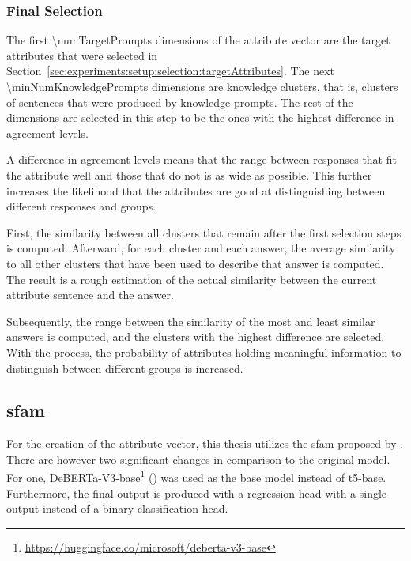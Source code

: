 \subsubsection{Final Selection} %
\label{sec:experiments:setup:selection:finalSelection}
The first \num{\numTargetPrompts} dimensions of the attribute vector are the target attributes that were selected in Section~\ref{sec:experiments:setup:selection:targetAttributes}. The next \num{\minNumKnowledgePrompts} dimensions are knowledge clusters, that is, clusters of sentences that were produced by knowledge prompts. The rest of the dimensions are selected in this step to be the ones with the highest difference in agreement levels.

A difference in agreement levels means that the range between responses that fit the attribute well and those that do not is as wide as possible. This further increases the likelihood that the attributes are good at distinguishing between different responses and groups.

% 

First, the similarity between all clusters that remain after the first selection steps is computed. Afterward, for each cluster and each answer, the average similarity to all other clusters that have been used to describe that answer is computed. The result is a rough estimation of the actual similarity between the current attribute sentence and the answer.

Subsequently, the range between the similarity of the most and least similar answers is computed, and the clusters with the highest difference are selected. With the process, the probability of attributes holding meaningful information to distinguish between different groups is increased.

\subsection{\acf{sfam}}
\label{sec:experiments:setup:sfam}
For the creation of the attribute vector, this thesis utilizes the \acl{sfam} proposed by \citet{patelLearningInterpretableStyle2023}. There are however two significant changes in comparison to the original model. For one, DeBERTa-V3-base\footnote{\url{https://huggingface.co/microsoft/deberta-v3-base}} (\cite{he2021deberta}) was used as the base model instead of t5-base. Furthermore, the final output is produced with a regression head with a single output instead of a binary classification head.

